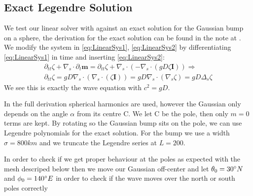 \subsection{Exact Legendre Solution}
We test our linear solver with against an exact solution for the Gaussian bump on a sphere, the derivation for the exact solution can be found in the note at \cite{Note_Jayshree}. We modify the system in \eqref{eq:LinearSys1}, \eqref{eq:LinearSys2} by differentiating \eqref{eq:LinearSys1} in time and inserting \eqref{eq:LinearSys2}:
\begin{align*}
    \partial_{tt}\zeta + \nabla_s\cdot\partial_t\mathbf{m} = \partial_{tt}\zeta + \nabla_s\cdot(-\nabla_s\cdot(gD\zeta\mathbf{I})) \Rightarrow \\
    \partial_{tt}\zeta = gD\nabla_s\cdot(\nabla_s\cdot(\zeta\mathbf{I})) = gD\nabla_s\cdot(\nabla_s\zeta) = gD\Delta_s\zeta
\end{align*}
We see this is exactly the wave equation with $c^2=gD$.

In the full derivation spherical harmonics are used, however the Gaussian only depends on the angle $\alpha$ from its centre C. We let C be the pole, then only $m=0$ terms are kept. By rotating so the Gaussian bump sits on the pole, we can use Legendre polynomials for the exact solution. For the bump we use a width $\sigma = 800km$ and we truncate the Legendre series at $L=200$. 

In order to check if we get proper behaviour at the poles as expected with the mesh descriped below then we move our Gaussian off-center and let $\theta_0=30\degree N$ and $\phi_0 = 140\degree E$ in order to check if the wave moves over the north or south poles correctly

